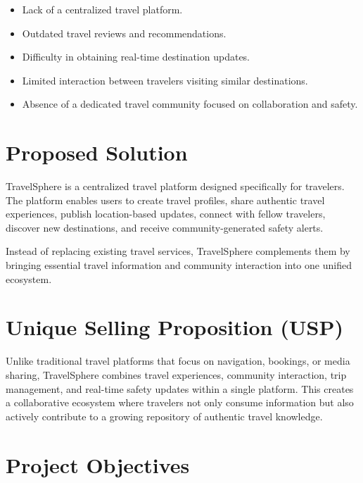 \documentclass[12pt,a4paper]{article}
\begin{document}
\begin{itemize}

\item Lack of a centralized travel platform.

\item Outdated travel reviews and recommendations.

\item Difficulty in obtaining real-time destination updates.

\item Limited interaction between travelers visiting similar destinations.

\item Absence of a dedicated travel community focused on collaboration and safety.

\end{itemize}


\section{Proposed Solution}

TravelSphere is a centralized travel platform designed specifically for travelers. The platform enables users to create travel profiles, share authentic travel experiences, publish location-based updates, connect with fellow travelers, discover new destinations, and receive community-generated safety alerts.

Instead of replacing existing travel services, TravelSphere complements them by bringing essential travel information and community interaction into one unified ecosystem.

\section{Unique Selling Proposition (USP)}

Unlike traditional travel platforms that focus on navigation, bookings, or media sharing, TravelSphere combines travel experiences, community interaction, trip management, and real-time safety updates within a single platform. This creates a collaborative ecosystem where travelers not only consume information but also actively contribute to a growing repository of authentic travel knowledge.


\section{Project Objectives}
\end{document}
